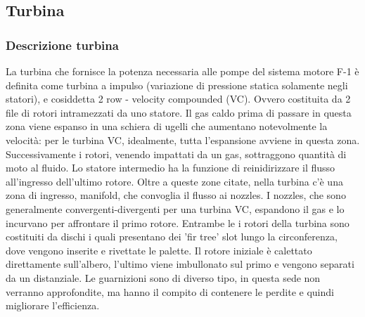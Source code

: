 
\subsection{Turbina}
\subsubsection{Descrizione turbina}
La turbina che fornisce la potenza necessaria alle pompe del sistema motore F-1 è definita come turbina a impulso (variazione di pressione statica solamente negli statori), e cosiddetta 2 row - velocity compounded (VC). Ovvero costituita da 2 file di rotori intramezzati da uno statore. Il gas caldo prima di passare in questa zona viene espanso in una schiera di ugelli che aumentano notevolmente la velocità: per le turbina VC, idealmente, tutta l'espansione avviene in questa zona. Successivamente i rotori, venendo impattati da un gas, sottraggono quantità di moto al fluido. Lo statore intermedio ha la funzione di reinidirizzare il flusso all'ingresso dell'ultimo rotore. Oltre a queste zone citate, nella turbina c'è una zona di ingresso, manifold, che convoglia il flusso ai nozzles. I nozzles, che sono generalmente convergenti-divergenti per una turbina VC, espandono il gas e lo incurvano per affrontare il primo rotore. Entrambe le i rotori della turbina sono costituiti da dischi i quali presentano dei 'fir tree' slot lungo la circonferenza, dove vengono inserite e rivettate le palette. Il rotore iniziale è calettato direttamente sull'albero, l'ultimo viene imbullonato sul primo e vengono separati da un distanziale. Le guarnizioni sono di diverso tipo, in questa sede non verranno approfondite, ma hanno il compito di contenere le perdite e quindi migliorare l'efficienza. 


